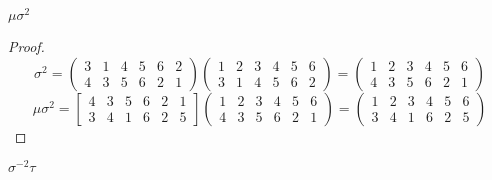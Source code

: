 \begin{exercise}
    $\mu{\sigma}^{2}$
\end{exercise}

\begin{proof}
    \[
        {\sigma}^{2} =
        \begin{pmatrix}
            3 & 1 & 4 & 5 & 6 & 2 \\
            4 & 3 & 5 & 6 & 2 & 1
        \end{pmatrix}
        \begin{pmatrix}
            1 & 2 & 3 & 4 & 5 & 6 \\
            3 & 1 & 4 & 5 & 6 & 2
        \end{pmatrix} =
        \begin{pmatrix}
            1 & 2 & 3 & 4 & 5 & 6 \\
            4 & 3 & 5 & 6 & 2 & 1
        \end{pmatrix}
    \]
    \[
        \mu{\sigma}^{2} =
        \begin{bmatrix}
            4 & 3 & 5 & 6 & 2 & 1 \\
            3 & 4 & 1 & 6 & 2 & 5
        \end{bmatrix}
        \begin{pmatrix}
            1 & 2 & 3 & 4 & 5 & 6 \\
            4 & 3 & 5 & 6 & 2 & 1
        \end{pmatrix} =
        \begin{pmatrix}
            1 & 2 & 3 & 4 & 5 & 6 \\
            3 & 4 & 1 & 6 & 2 & 5
        \end{pmatrix}
    \]
\end{proof}

\begin{exercise}
    ${\sigma}^{-2}\tau$
\end{exercise}

